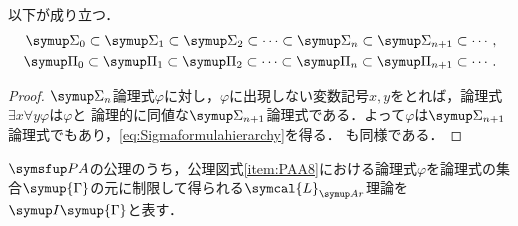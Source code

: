 
\begin{Lemma} \label{Lemma:formulahierarchy}
	以下が成り立つ．
	\begin{align}
		\SigmaFormula_0 \subset \SigmaFormula_1 \subset \SigmaFormula_2 \subset \dotsb \subset \SigmaFormula_n \subset \SigmaFormula_{n + 1} \subset \dotsb,
		\label{eq:Sigmaformulahierarchy} \\
		\PiFormula_0 \subset \PiFormula_1 \subset \PiFormula_2 \subset \dotsb \subset \PiFormula_n \subset \PiFormula_{n+1} \subset \dotsb.
		\label{eq:Piformulahierarchy}
	\end{align}
\end{Lemma}

\begin{proof}
	\(\SigmaFormula_n\)論理式\(\varphi\)に対し，\(\varphi\)に出現しない変数記号\(x, y\)をとれば，論理式\(\exists x \forall y \varphi\)は\(\varphi\)と
	論理的に同値な\(\SigmaFormula_{n + 1}\)論理式である．よって\(\varphi\)は\(\SigmaFormula_{n + 1}\)論理式でもあり，\cref{eq:Sigmaformulahierarchy}を得る．
	も同様である．
\end{proof}


\begin{Def} \label{Def:paa8restriction}
	\(\PA\)の公理のうち，公理図式\cref{item:PAA8}における論理式\(\varphi\)を論理式の集合\(\symup{\Gamma}\)の元に制限して得られる\(\symcal{L}_{\Ar}\)理論を
	\(\InductionLimitedTheory{\symup{\Gamma}}\)と表す．
\end{Def}


